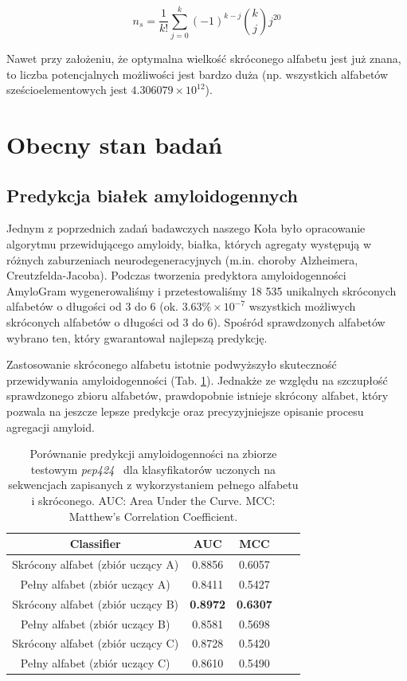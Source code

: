 \documentclass{article}
\begin{document}
$$ n_s = \frac{1}{k!} \sum^{k}_{j = 0} (-1)^{k-j}  {k \choose j} j^{20} $$

Nawet przy założeniu, że optymalna wielkość skróconego alfabetu jest już znana, 
to liczba potencjalnych możliwości jest bardzo duża (np. wszystkich alfabetów 
sześcioelementowych jest $4.306079 \times 10^{12}$).

\section{Obecny stan badań}

\subsection{Predykcja białek amyloidogennych}

Jednym z poprzednich zadań badawczych naszego Koła było opracowanie algorytmu 
przewidującego amyloidy, białka, których agregaty występują w różnych 
zaburzeniach neurodegeneracyjnych (m.in. choroby Alzheimera, 
Creutzfelda-Jacoba). Podczas tworzenia predyktora amyloidogenności AmyloGram 
wygenerowaliśmy i przetestowaliśmy 18 535 unikalnych skróconych alfabetów o 
długości od 3 do 6 (ok. $3.63\% \times 10^{-7} $ wszystkich możliwych skróconych 
alfabetów o długości od 3 do 6). Spośród sprawdzonych alfabetów wybrano ten, 
który gwarantował najlepszą predykcję. 

Zastosowanie skróconego alfabetu istotnie podwyższyło skuteczność przewidywania 
amyloidogenności (Tab. \ref{tab:alfabety}). Jednakże ze względu na szczupłość 
sprawdzonego zbioru alfabetów, prawdopobnie istnieje skrócony alfabet, który 
pozwala na jeszcze lepsze predykcje oraz precyzyjniejsze opisanie procesu 
agregacji amyloid.

\begin{table}[ht]
\centering
\small
\caption{Porównanie predykcji amyloidogenności na zbiorze testowym 
\textit{pep424}~\citep{walsh_pasta_2014} dla klasyfikatorów uczonych na 
sekwencjach zapisanych z wykorzystaniem pełnego alfabetu i skróconego. AUC: Area 
Under the Curve. MCC: Matthew's Correlation Coefficient.} 
\label{tab:alfabety}
\begin{tabular}{ccccc}
  \toprule
Classifier & AUC & MCC  \\ 
  \midrule
Skrócony alfabet (zbiór uczący A) & 0.8856 & 0.6057  \\
   \rowcolor[gray]{0.85}Pełny alfabet (zbiór uczący A) & 0.8411 & 0.5427 \\ 

Skrócony alfabet (zbiór uczący B) & \textbf{0.8972} & \textbf{0.6307}  \\ 
  \rowcolor[gray]{0.85}Pełny alfabet (zbiór uczący B) & 0.8581 & 0.5698 
\\ 
Skrócony alfabet (zbiór uczący C) & 0.8728 & 0.5420 
\\
   \rowcolor[gray]{0.85}Pełny alfabet (zbiór uczący C) & 0.8610 & 0.5490 & \\
   \bottomrule
\end{tabular}
\end{table}
\end{document}

